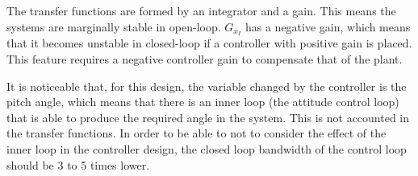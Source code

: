 The transfer functions are formed by an integrator and a gain. This means the systems are marginally stable in open-loop. $G_{x_I}$ has a negative gain, which means that it becomes unstable in closed-loop if a controller with positive gain is placed. This feature requires a negative controller gain to compensate that of the plant.

It is noticeable that, for this design, the variable changed by the controller is the pitch angle, which means that there is an inner loop (the attitude control loop) that is able to produce the required angle in the system. This is not accounted in the transfer functions. In order to be able to not to consider the effect of the inner loop in the controller design, the closed loop bandwidth of the control loop should be 3 to 5 times lower. 

